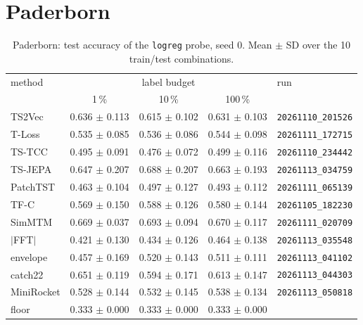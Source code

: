 \section{Paderborn}
\begin{table}[h]
\centering
\begin{tabular}{lcccl}
\toprule
method & \multicolumn{3}{c}{label budget} & run \\
 & 1\,\% & 10\,\% & 100\,\% & \\
\midrule
TS2Vec & 0.636 $\pm$ 0.113 & 0.615 $\pm$ 0.102 & 0.631 $\pm$ 0.103 & \texttt{\footnotesize 20261110\_201526} \\
T-Loss & 0.535 $\pm$ 0.085 & 0.536 $\pm$ 0.086 & 0.544 $\pm$ 0.098 & \texttt{\footnotesize 20261111\_172715} \\
TS-TCC & 0.495 $\pm$ 0.091 & 0.476 $\pm$ 0.072 & 0.499 $\pm$ 0.116 & \texttt{\footnotesize 20261110\_234442} \\
TS-JEPA & 0.647 $\pm$ 0.207 & 0.688 $\pm$ 0.207 & 0.663 $\pm$ 0.193 & \texttt{\footnotesize 20261113\_034759} \\
PatchTST & 0.463 $\pm$ 0.104 & 0.497 $\pm$ 0.127 & 0.493 $\pm$ 0.112 & \texttt{\footnotesize 20261111\_065139} \\
TF-C & 0.569 $\pm$ 0.150 & 0.588 $\pm$ 0.126 & 0.580 $\pm$ 0.144 & \texttt{\footnotesize 20261105\_182230} \\
SimMTM & 0.669 $\pm$ 0.037 & 0.693 $\pm$ 0.094 & 0.670 $\pm$ 0.117 & \texttt{\footnotesize 20261111\_020709} \\
\midrule
$|$FFT$|$ & 0.421 $\pm$ 0.130 & 0.434 $\pm$ 0.126 & 0.464 $\pm$ 0.138 & \texttt{\footnotesize 20261113\_035548} \\
envelope & 0.457 $\pm$ 0.169 & 0.520 $\pm$ 0.143 & 0.511 $\pm$ 0.111 & \texttt{\footnotesize 20261113\_041102} \\
catch22 & 0.651 $\pm$ 0.119 & 0.594 $\pm$ 0.171 & 0.613 $\pm$ 0.147 & \texttt{\footnotesize 20261113\_044303} \\
MiniRocket & 0.528 $\pm$ 0.144 & 0.532 $\pm$ 0.145 & 0.538 $\pm$ 0.134 & \texttt{\footnotesize 20261113\_050818} \\
\midrule
floor & 0.333 $\pm$ 0.000 & 0.333 $\pm$ 0.000 & 0.333 $\pm$ 0.000 & \\
\bottomrule
\end{tabular}
\caption{Paderborn: test accuracy of the \texttt{logreg} probe, seed 0. Mean $\pm$ SD over the 10 train/test combinations.}
\end{table}

